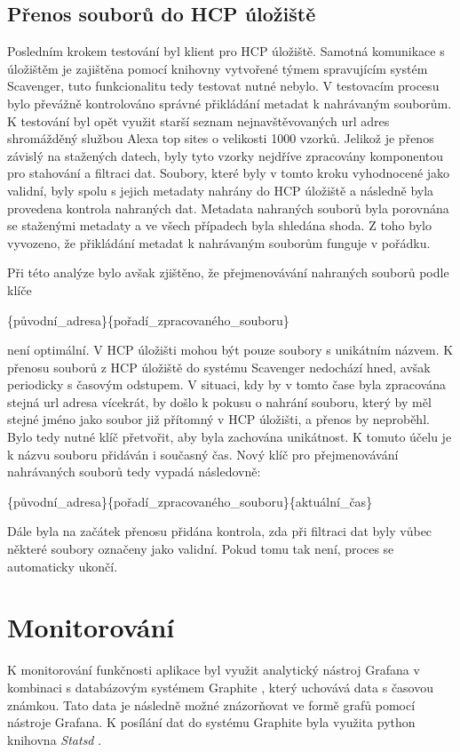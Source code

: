 \documentclass[thesis=M,czech,hidelinks]{FITthesis}[2013/05/06]
\begin{document}
\subsection{Přenos souborů do HCP úložiště}
Posledním krokem testování byl klient pro HCP úložiště. Samotná komunikace s úložištěm je zajištěna pomocí knihovny vytvořené týmem spravujícím systém Scavenger, tuto funkcionalitu tedy testovat nutné nebylo. V testovacím procesu bylo převážně kontrolováno správné přikládání metadat k nahrávaným souborům. K testování byl opět využit starší seznam nejnavštěvovaných url adres shromážděný službou Alexa top sites \cite{alexa} o velikosti 1000 vzorků. Jelikož je přenos závislý na stažených datech, byly tyto vzorky nejdříve zpracovány komponentou pro stahování a filtraci dat. Soubory, které byly v tomto kroku vyhodnocené jako validní, byly spolu s jejich metadaty nahrány do HCP úložiště a následně byla provedena kontrola nahraných dat. Metadata nahraných souborů byla porovnána se staženými metadaty a ve všech případech byla shledána shoda. Z toho bylo vyvozeno, že přikládání metadat k nahrávaným souborům funguje v pořádku. 

Při této analýze bylo avšak zjištěno, že přejmenovávání nahraných souborů podle klíče
\begin{center}\label{prej}
\{původní\_adresa\}\{pořadí\_zpracovaného\_souboru\}
\end{center}
 není optimální. V HCP úložišti mohou být pouze soubory s unikátním názvem. K přenosu souborů z HCP úložiště do systému Scavenger nedochází hned, avšak periodicky s časovým odstupem. V situaci, kdy by v tomto čase byla zpracována stejná url adresa vícekrát, by došlo k pokusu o nahrání souboru, který by měl stejné jméno jako soubor již přítomný v HCP úložišti, a přenos by neproběhl. Bylo tedy nutné klíč přetvořit, aby byla zachována unikátnost. K tomuto účelu je k názvu souboru přidáván i současný čas. Nový klíč pro přejmenovávání nahrávaných souborů tedy vypadá následovně: 
\begin{center}\label{prejm}
\{původní\_adresa\}\{pořadí\_zpracovaného\_souboru\}\{aktuální\_čas\}
\end{center}

Dále byla na začátek přenosu přidána kontrola, zda při filtraci dat byly vůbec některé soubory označeny jako validní. Pokud tomu tak není, proces se automaticky ukončí.


\section{Monitorování}\label{monitoring}
K monitorování funkčnosti aplikace byl využit analytický nástroj Grafana \cite{grafana} v kombinaci s databázovým systémem Graphite \cite{graphite}, který uchovává data s časovou známkou. Tato data je následně možné znázorňovat ve formě grafů pomocí nástroje Grafana. K posílání dat do systému Graphite byla využita python knihovna \textit{Statsd} \cite{statistika}.
\end{document}
